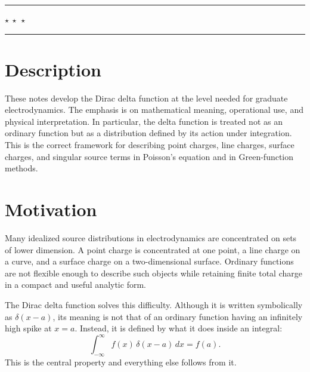 \documentclass[12pt]{article}
\title{}
\author{}
\date{}
\begin{document}
\\
\\
\\[0.4cm]

\\
\\

\vspace{0.3cm}

\begin{center}
    \rule{0.25\textwidth}{0.4pt}\hspace{0.4em}$\star\ \star\ \star$\hspace{0.4em}\rule{0.25\textwidth}{0.4pt}
\end{center}

\vspace{0.5cm}

\section*{Description}
These notes develop the Dirac delta function at the level needed for graduate electrodynamics. The emphasis is on mathematical meaning, operational use, and physical interpretation. In particular, the delta function is treated not as an ordinary function but as a distribution defined by its action under integration. This is the correct framework for describing point charges, line charges, surface charges, and singular source terms in Poisson's equation and in Green-function methods.

\section{Motivation}
Many idealized source distributions in electrodynamics are concentrated on sets of lower dimension. A point charge is concentrated at one point, a line charge on a curve, and a surface charge on a two-dimensional surface. Ordinary functions are not flexible enough to describe such objects while retaining finite total charge in a compact and useful analytic form.

The Dirac delta function solves this difficulty. Although it is written symbolically as $\delta(x-a)$, its meaning is not that of an ordinary function having an infinitely high spike at $x=a$. Instead, it is defined by what it does inside an integral:
\[
\int_{-\infty}^{\infty} f(x)\,\delta(x-a)\,dx=f(a).
\]
This is the central property and everything else follows from it.
\end{document}
